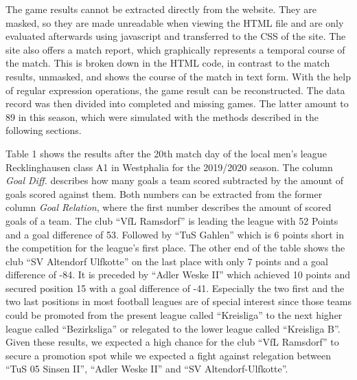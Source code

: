 \documentclass[12pt,a4paper]{article}
\begin{document}
The game results cannot be extracted directly from the website. They are
masked, so they are made unreadable when viewing the HTML file and are
only evaluated afterwards using javascript and transferred to the CSS of
the site. The site also offers a match report, which graphically
represents a temporal course of the match. This is broken down in the
HTML code, in contrast to the match results, unmasked, and shows the
course of the match in text form. With the help of regular expression
operations, the game result can be reconstructed. The data record was
then divided into completed and missing games. The latter amount to 89
in this season, which were simulated with the methods described in the
following sections.

Table 1 shows the results after the 20th match day of the local men's
league Recklinghausen class A1 in Westphalia for the 2019/2020 season.
The column \emph{Goal Diff.} describes how many goals a team scored
subtracted by the amount of goals scored against them. Both numbers can
be extracted from the former column \emph{Goal Relation}, where the
first number describes the amount of scored goals of a team. The club
\enquote{VfL Ramsdorf} is leading the league with 52 Points and a goal
difference of 53. Followed by \enquote{TuS Gahlen} which is 6 points
short in the competition for the league's first place. The other end of
the table shows the club \enquote{SV Altendorf Ulfkotte} on the last
place with only 7 points and a goal difference of -84. It is preceded by
\enquote{Adler Weske II} which achieved 10 points and secured position
15 with a goal difference of -41. Especially the two first and the two
last positions in most football leagues are of special interest since
those teams could be promoted from the present league called
\enquote{Kreisliga} to the next higher league called
\enquote{Bezirksliga} or relegated to the lower league called
\enquote{Kreisliga B}. Given these results, we expected a high chance
for the club \enquote{VfL Ramsdorf} to secure a promotion spot while we
expected a fight against relegation between \enquote{TuS 05 Sinsen II},
\enquote{Adler Weske II} and \enquote{SV Altendorf-Ulfkotte}.
\end{document}
